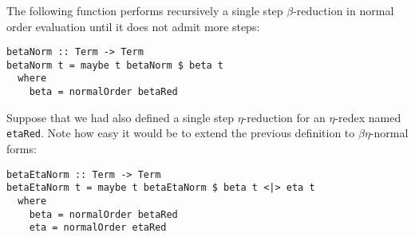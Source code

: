 \documentclass{article}
\begin{document}
\subsubsection{}

The following function performs recursively a single step 
$\beta$-reduction in normal order evaluation until it does 
not admit more steps:

\begin{verbatim}
betaNorm :: Term -> Term
betaNorm t = maybe t betaNorm $ beta t
  where
    beta = normalOrder betaRed
\end{verbatim}

Suppose that we had also defined a single step $\eta$-reduction 
for an $\eta$-redex named \verb|etaRed|. Note how easy it would 
be to extend the previous definition to $\beta\eta$-normal forms:

\begin{verbatim}
betaEtaNorm :: Term -> Term
betaEtaNorm t = maybe t betaEtaNorm $ beta t <|> eta t
  where
    beta = normalOrder betaRed
    eta = normalOrder etaRed
\end{verbatim}
\end{document}
